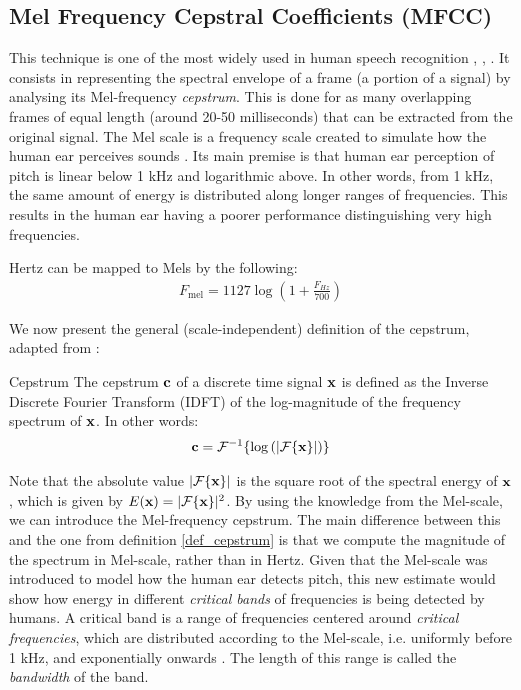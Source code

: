 \documentclass[../main.tex]{subfiles} \label{chapter_soa}
\begin{document}
\subsection{Mel Frequency Cepstral Coefficients (MFCC)} \label{subsection_mfcc}
\par This technique is one of the most widely used in human speech recognition \cite{Jurafsky2009}, \cite{Chou2008a}, \cite{Stowell2014}. It consists in representing the spectral envelope of a frame (a portion of a signal) by analysing its Mel-frequency \emph{cepstrum}. This is done for as many overlapping frames of equal length (around 20-50 milliseconds) that can be extracted from the original signal. The Mel scale is a frequency scale created to simulate how the human ear perceives sounds \cite{Sludge2000}. Its main premise is that human ear perception of pitch is linear below 1 kHz and logarithmic above. In other words, from 1 kHz, the same amount of energy is distributed along longer ranges of frequencies. This results in the human ear having a poorer performance distinguishing very high frequencies.
\par Hertz can be mapped to Mels by the following:
\begin{align*}
F_{\text{mel}} = 1127 \log{(1 + \frac{F_{Hz}}{700})}
\end{align*}
\theoremstyle{definition}
\par We now present the general (scale-independent) definition of the cepstrum, adapted from \cite{Gutierrez-Osuna2009}:
\begin{definition}{Cepstrum} \label{def_cepstrum}
The cepstrum $\mathbf{c}$ of a discrete time signal $\mathbf{x}$ is defined as the Inverse Discrete Fourier Transform (IDFT) of the log-magnitude of the frequency spectrum of $\mathbf{x}$. In other words:
\begin{align*}
\mathbf{c} = \mathcal{F}^{-1}\{\log{(\lvert\mathcal{F}\{\mathbf{x}\}\rvert)}\}
\end{align*}
\end{definition}
\par Note that the absolute value $\lvert\mathcal{F}\{\mathbf{x}\}\rvert$ is the square root of the spectral energy of $\mathbf{x}$, which is given by $E(\mathbf{x}) = \lvert\mathcal{F}\{\mathbf{x}\}\rvert^2$. By using the knowledge from the Mel-scale, we can introduce the Mel-frequency cepstrum. The main difference between this and the one from definition \ref{def_cepstrum} is that we compute the magnitude of the spectrum in Mel-scale, rather than in Hertz. Given that the Mel-scale was introduced to model how the human ear detects pitch, this new estimate would show how energy in different \emph{critical bands} of frequencies is being detected by humans. A critical band is a range of frequencies centered around \emph{critical frequencies}, which are distributed according to the Mel-scale, i.e. uniformly before 1 kHz, and exponentially onwards \cite{Gutierrez-Osuna2009}. The length of this range is called the \emph{bandwidth} of the band.
\end{document}
